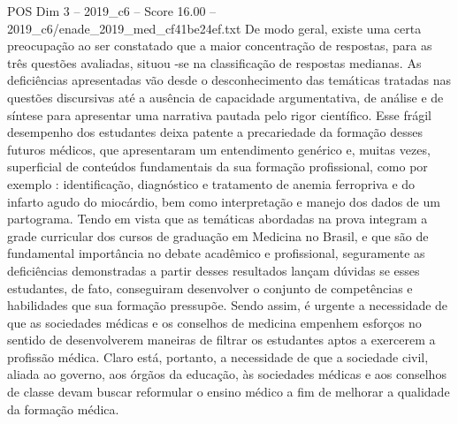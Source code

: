 \begin{textsample}{POS Dim 3 – 2019\_c6 – Score 16.00 – 2019\_c6/enade\_2019\_med\_cf41be24ef.txt}
De modo geral, existe uma certa preocupação ao ser constatado que a maior concentração de respostas, para as três questões avaliadas, situou -se na classificação de respostas medianas.
As deficiências apresentadas vão desde o desconhecimento das temáticas tratadas nas questões discursivas até a ausência de capacidade argumentativa, de análise e de síntese para apresentar uma narrativa pautada pelo rigor científico.
Esse frágil desempenho dos estudantes deixa patente a precariedade da formação desses futuros médicos, que apresentaram um entendimento genérico e, muitas vezes, superficial de conteúdos fundamentais da sua formação profissional, como por exemplo : identificação, diagnóstico e tratamento de anemia ferropriva e do infarto agudo do miocárdio, bem como interpretação e manejo dos dados de um partograma.
Tendo em vista que as temáticas abordadas na prova integram a grade curricular dos cursos de graduação em Medicina no Brasil, e que são de fundamental importância no debate acadêmico e profissional, seguramente as deficiências demonstradas a partir desses resultados lançam dúvidas se esses estudantes, de fato, conseguiram desenvolver o conjunto de competências e habilidades que sua formação pressupõe.
Sendo assim, é urgente a necessidade de que as sociedades médicas e os conselhos de medicina empenhem esforços no sentido de desenvolverem maneiras de filtrar os estudantes aptos a exercerem a profissão médica.
Claro está, portanto, a necessidade de que a sociedade civil, aliada ao governo, aos órgãos da educação, às sociedades médicas e aos conselhos de classe devam buscar reformular o ensino médico a fim de melhorar a qualidade da formação médica.

\end{textsample}
